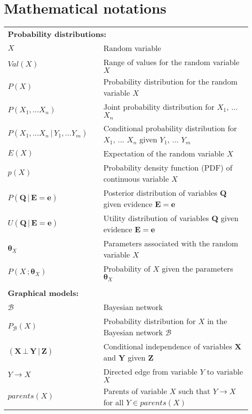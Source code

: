 
\chapter*{Mathematical notations}
\thispagestyle{empty}

\begin{longtable}{lp{5mm}p{11cm}}
\multicolumn{3}{l}{\textbf{Probability distributions:}} \vspace{2mm} \\
$X$ && Random variable \\
$Val(X)$ && Range of values for the random variable $X$ \\
$P(X)$ && Probability distribution for the random variable $X$ \\
$P(X_1, ...X_n)$ && Joint probability distribution for $X_1$, ... $X_n$ \\
$P(X_1,...X_n \, | \, Y_1, ... Y_m)$ && Conditional probability distribution for $X_1$, ... $X_n$ given $Y_1$, ... $Y_m$  \\ 
$E(X)$ && Expectation of the random variable $X$ \\
$p(X)$ && Probability density function (PDF) of continuous variable $X$ \\
 $P(\mathbf{Q}  \, | \,  \mathbf{E}\!=\!\mathbf{e})$ && Posterior distribution of variables $\mathbf{Q}$ given evidence $\mathbf{E}\!=\!\mathbf{e}$ \\ 
 $U(\mathbf{Q}  \, | \,  \mathbf{E}\!=\!\mathbf{e})$ && Utility distribution of variables $\mathbf{Q}$ given evidence $\mathbf{E}\!=\!\mathbf{e}$ \\ 
 $\boldsymbol\theta_{X}$ && Parameters associated with the random variable $X$ \\ 
 $P(X\,;\boldsymbol\theta_{X})$ && Probability of $X$ given the parameters $\boldsymbol\theta_{X}$ \\ 
 
&&  \vspace{0mm} \\
\multicolumn{3}{l}{\textbf{Graphical models:}} \vspace{2mm} \\
 $\mathcal{B}$ && Bayesian network \\
 $P_\mathcal{B}(X)$ && Probability distribution for $X$ in the Bayesian network $\mathcal{B}$ \\ 
$(\mathbf{X} \, \bot \, \mathbf{Y} \, | \, \mathbf{Z})$ && Conditional independence of variables $\mathbf{X} $ and $\mathbf{Y}$ given $\mathbf{Z}$ \\
$Y \rightarrow X$ && Directed edge from variable $Y$ to variable $X$ \\
$parents(X)$ && Parents of variable $X$ such that $Y \rightarrow X$ for all $Y\!\in\!parents(X)$ \\


\end{longtable}
